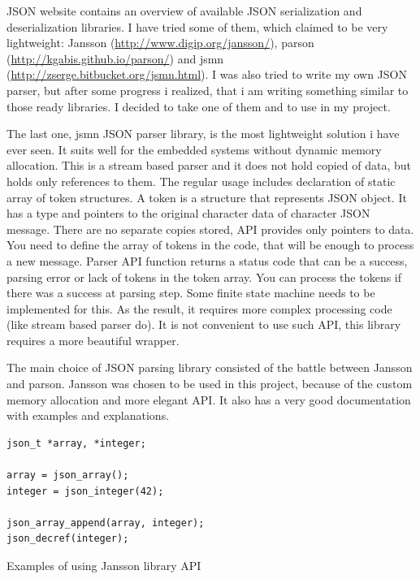 JSON website \cite{json_org} contains an overview of available JSON serialization and deserialization libraries.
I have tried some of them, which claimed to be very lightweight: Jansson
(\url{http://www.digip.org/jansson/}), parson
(\url{http://kgabis.github.io/parson/}) and jsmn
(\url{http://zserge.bitbucket.org/jsmn.html}).
I was also tried to write my own
JSON parser, but after some progress i realized, that i am writing something similar to those ready libraries.
I decided to take one of them and to use in my project.

The last one, jsmn JSON parser library, is the most lightweight solution i have ever seen.
It suits well for the embedded systems without dynamic  memory allocation. 
This is a stream based parser and it does not hold copied of data, but holds only references to them.
The regular usage includes declaration of static array of token structures. 
A token is a structure that represents JSON object. 
It has a type and pointers to the original character data of character JSON message.
There are no separate copies stored, API provides only pointers to data.
You need to define the array of tokens in the code, that will be enough to process a new message. 
Parser API function returns a status code that can be a success, parsing error or lack of tokens in the token array.
You can process the tokens if there was a success at parsing step.
Some finite state machine needs to be implemented for this. As the result, it requires more complex processing code (like stream based parser do).
It is not convenient to use such API, this library requires a more beautiful wrapper.

The main choice of JSON parsing library consisted of the battle between Jansson and parson.
Jansson was chosen to be used in this project, because of the custom memory allocation and more elegant API.
It also has a very good documentation with examples and explanations.

\begin{listing}[H]
\begin{verbatim}
json_t *array, *integer;

array = json_array();
integer = json_integer(42);

json_array_append(array, integer);
json_decref(integer); 
\end{verbatim}
\caption{Examples of using Jansson library API}
\label{lst:jansson_example}
\end{listing}

